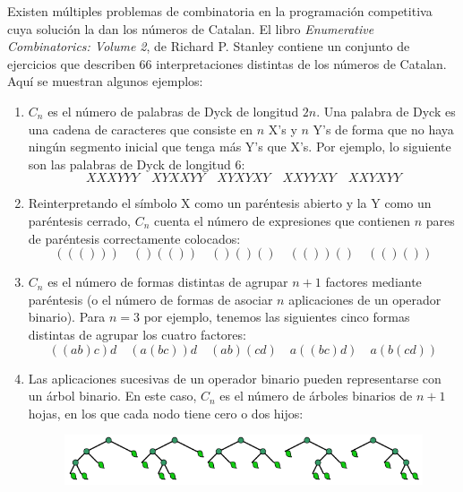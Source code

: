 Existen múltiples problemas de combinatoria en la programación competitiva  cuya solución la dan los números de Catalan. El libro \emph{Enumerative Combinatorics: Volume 2}, de Richard P. Stanley contiene un conjunto de ejercicios que describen 66 interpretaciones distintas de los números de Catalan. Aquí se muestran algunos ejemplos:

\begin{enumerate}
	\item $C_n$ es el número de palabras de Dyck de longitud $2n$. Una palabra de Dyck es una cadena de caracteres que consiste en $n$ X's y $n$ Y's de forma que no haya ningún segmento inicial que tenga más Y's que X's. Por ejemplo, lo siguiente son las palabras de Dyck de longitud 6:
	$$XXXYYY   \quad  XYXXYY  \quad    XYXYXY  \quad   XXYYXY \quad    XXYXYY$$
	
	\item Reinterpretando el símbolo X como un paréntesis abierto y la Y como un paréntesis cerrado, $C_n$ cuenta el número de expresiones que contienen $n$ pares de paréntesis correctamente colocados:
		$$((()))  \quad   ()(())   \quad  ()()()  \quad   (())()  \quad   (()())$$
	
	\item $C_n$ es el número de formas distintas de agrupar $n + 1$ factores mediante paréntesis (o el número de formas de asociar $n$ aplicaciones de un operador binario). Para $n = 3$ por ejemplo, tenemos las siguientes cinco formas distintas de agrupar los cuatro factores:
	$$((ab)c)d  \quad (a(bc))d  \quad (ab)(cd)  \quad a((bc)d)  \quad a(b(cd))$$
	
	\item Las aplicaciones sucesivas de un operador binario pueden representarse con un árbol binario. En este caso, $C_n$ es el número de árboles binarios de $n + 1$ hojas, en los que cada nodo tiene cero o dos hijos:
	\begin{figure}[h!]
		\centering
		\includegraphics[width=0.7\linewidth]{img/catalan_leaves_binary_tree_example}
		\label{fig:catalanleavesbinarytreeexample}
	\end{figure}
	

\end{enumerate}
